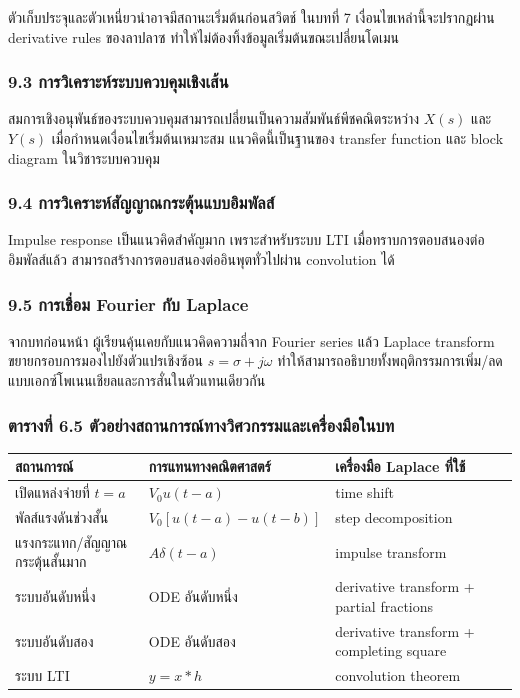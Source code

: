 ตัวเก็บประจุและตัวเหนี่ยวนำอาจมีสถานะเริ่มต้นก่อนสวิตช์ ในบทที่ 7 เงื่อนไขเหล่านี้จะปรากฏผ่าน derivative rules ของลาปลาซ ทำให้ไม่ต้องทิ้งข้อมูลเริ่มต้นขณะเปลี่ยนโดเมน

\subsubsection{9.3 การวิเคราะห์ระบบควบคุมเชิงเส้น}

สมการเชิงอนุพันธ์ของระบบควบคุมสามารถเปลี่ยนเป็นความสัมพันธ์พีชคณิตระหว่าง $X(s)$ และ $Y(s)$ เมื่อกำหนดเงื่อนไขเริ่มต้นเหมาะสม แนวคิดนี้เป็นฐานของ transfer function และ block diagram ในวิชาระบบควบคุม

\subsubsection{9.4 การวิเคราะห์สัญญาณกระตุ้นแบบอิมพัลส์}

Impulse response เป็นแนวคิดสำคัญมาก เพราะสำหรับระบบ LTI เมื่อทราบการตอบสนองต่ออิมพัลส์แล้ว สามารถสร้างการตอบสนองต่ออินพุตทั่วไปผ่าน convolution ได้

\subsubsection{9.5 การเชื่อม Fourier กับ Laplace}

จากบทก่อนหน้า ผู้เรียนคุ้นเคยกับแนวคิดความถี่จาก Fourier series แล้ว Laplace transform ขยายกรอบการมองไปยังตัวแปรเชิงซ้อน $s=\sigma+j\omega$ ทำให้สามารถอธิบายทั้งพฤติกรรมการเพิ่ม/ลดแบบเอกซ์โพเนนเชียลและการสั่นในตัวแทนเดียวกัน

\subsubsection{ตารางที่ 6.5 ตัวอย่างสถานการณ์ทางวิศวกรรมและเครื่องมือในบท}

\begin{table}[htbp]
    \centering
    \small
    \begin{tabularx}{\textwidth}{>{\raggedright\arraybackslash}p{} >{\raggedright\arraybackslash}p{} X}
        \hline
        \textbf{สถานการณ์} & \textbf{การแทนทางคณิตศาสตร์} & \textbf{เครื่องมือ Laplace ที่ใช้} \\
        \hline
        เปิดแหล่งจ่ายที่ $t=a$ & $V_0u(t-a)$ & time shift \\
        พัลส์แรงดันช่วงสั้น & $V_0[u(t-a)-u(t-b)]$ & step decomposition \\
        แรงกระแทก/สัญญาณกระตุ้นสั้นมาก & $A\delta(t-a)$ & impulse transform \\
        ระบบอันดับหนึ่ง & ODE อันดับหนึ่ง & derivative transform + partial fractions \\
        ระบบอันดับสอง & ODE อันดับสอง & derivative transform + completing square \\
        ระบบ LTI & $y=x*h$ & convolution theorem \\
        \hline
    \end{tabularx}
\end{table}



